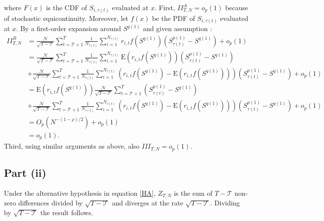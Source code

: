 where $F\left( x \right)$ is the CDF of $S_{i,\tau(t) }$ evaluated at $x$. First, $II_{T,N}^{A}=o_{p}(1)$ because of stochastic equicontinuity. Moreover, let $f(x)$ be the PDF of $S_{i,\tau(t) }$ evaluated at $x$. By a first-order expansion around $S^{q(1)}$ and given assumption :
\begin{align*}
II_{T,N}^{B} &= \frac{\mathcal{N}}{\sqrt{T-\mathcal{T}}}\sum_{t=\mathcal{T}+1}^{T}\frac{1}{N_{\tau(t)}} \sum_{i=1}^{N_{\tau(t)}} r_{i,t}f\left( S^{q(1)} \right) \left( S_{\tau(t) }^{p(1)}-S^{q(1)} \right) + o_p(1) \\
&= \frac{\mathcal{N}}{\sqrt{T-\mathcal{T}}}\sum_{t=\mathcal{T}+1}^{T}\frac{1}{N_{\tau(t)}} \sum_{i=1}^{N_{\tau(t)}} \mathrm{E} \left( r_{i,t} f\left( S^{q(1)} \right) \right)  \left( S_{\tau(t) }^{p(1)}-S^{q(1)} \right) \\
&+ \frac{\mathcal{N}}{\sqrt{T-\mathcal{T}}}\sum_{t=\mathcal{T}+1}^{T}\frac{1}{N_{\tau(t)}} \sum_{i=1}^{N_{\tau(t)}} \left( r_{i,t} f\left( S^{q(1)} \right) - \mathrm{E} \left( r_{i,t} f\left( S^{q(1)} \right) \right) \right) \left( S_{\tau(t) }^{p(1)}-S^{q(1)} \right) + o_p(1) \\
&= \mathrm{E}\left( r_{i,t} f \left( S^{q(1)} \right) \right) \frac{\mathcal{N}}{\sqrt{T-\mathcal{T}}}\sum_{t=\mathcal{T}+1}^{T} \left( S_{\tau(t) }^{p(1)}-S^{q(1)} \right) \\
&+ \frac{\mathcal{N}}{\sqrt{T-\mathcal{T}}}\sum_{t=\mathcal{T}+1}^{T}\frac{1}{N_{\tau(t)}} \sum_{i=1}^{N_{\tau(t)}} \left( r_{i,t} f\left( S^{q(1)} \right) - \mathrm{E} \left( r_{i,t} f\left( S^{q(1)} \right) \right) \right) \left( S_{\tau(t) }^{p(1)}-S^{q(1)} \right) + o_p(1) \\
&= O_{p} \left( N^{-(1-\rho)/2} \right) + o_{p}(1) \\
&=o_{p}(1).
\end{align*} 
Third, using similar arguments as above, also $III_{T,N}=o_{p}(1)$. 

\subsection{Part (ii)}

Under the alternative hypothesis in equation \eqref{HA}, $Z_{T,N}$ is the sum of $T-\mathcal{T}$ non-zero differences divided by $\sqrt{T-\mathcal{T}}$ and diverges at the rate $\sqrt{T-\mathcal{T}}$. Dividing by $\sqrt{T-\mathcal{T}}$ the result follows.




